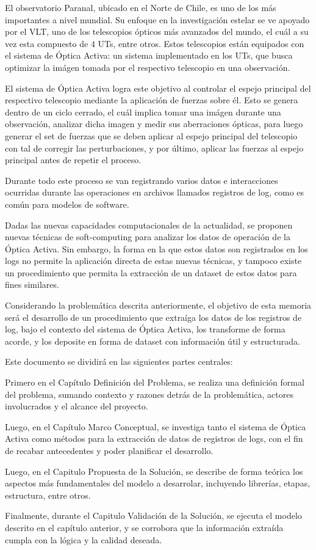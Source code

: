 
El observatorio Paranal, ubicado en el Norte de Chile, es uno de los más importantes a nivel mundial. Su enfoque en la investigación estelar se ve apoyado por el VLT, uno de los telescopios ópticos más avanzados del mundo, el cuál a su vez esta compuesto de 4 UTs, entre otros. Estos telescopios están equipados con el sistema de Óptica Activa: un sistema implementado en los UTs, que busca optimizar la imágen tomada por el respectivo telescopio en una observación.

El sistema de Óptica Activa logra este objetivo al controlar el espejo principal del respectivo telescopio mediante la aplicación de fuerzas sobre él. Esto se genera dentro de un ciclo cerrado, el cuál implica tomar una imágen durante una observación, analizar dicha imagen y medir sus aberraciones ópticas, para luego generar el set de fuerzas que se deben aplicar al espejo principal del telescopio con tal de corregir las perturbaciones, y por último, aplicar las fuerzas al espejo principal antes de repetir el proceso.

Durante todo este proceso se van registrando varios datos e interacciones ocurridas durante las operaciones en archivos llamados registros de log, como es común para modelos de software.

Dadas las nuevas capacidades computacionales de la actualidad, se proponen nuevas técnicas de soft-computing para analizar los datos de operación de la Óptica Activa. Sin embargo, la forma en la que estos datos son registrados en los logs no permite la aplicación directa de estas nuevas técnicas, y tampoco existe un procedimiento que permita la extracción de un dataset de estos datos para fines similares.

Considerando la problemática descrita anteriormente, el objetivo de esta memoria será el desarrollo de un procedimiento que extraíga los datos de los registros de log, bajo el contexto del sistema de Óptica Activa, los transforme de forma acorde, y los deposite en forma de dataset con información útil y estructurada.

Este documento se dividirá en las siguientes partes centrales:

Primero en el Capítulo Definición del Problema, se realiza una definición formal del problema, sumando contexto y razones detrás de la problemática, actores involucrados y el alcance del proyecto.

Luego, en el Capítulo Marco Conceptual, se investiga tanto el sistema de Óptica Activa como métodos para la extracción de datos de registros de logs, con el fin de recabar antecedentes y poder planificar el desarrollo.

Luego, en el Capitulo Propuesta de la Solución, se describe de forma teórica los aspectos más fundamentales del modelo a desarrolar, incluyendo librerías, etapas, estructura, entre otros.

Finalmente, durante el Capitulo Validación de la Solución, se ejecuta el modelo descrito en el capítulo anterior, y se corrobora que la información extraída cumpla con la lógica y la calidad deseada.